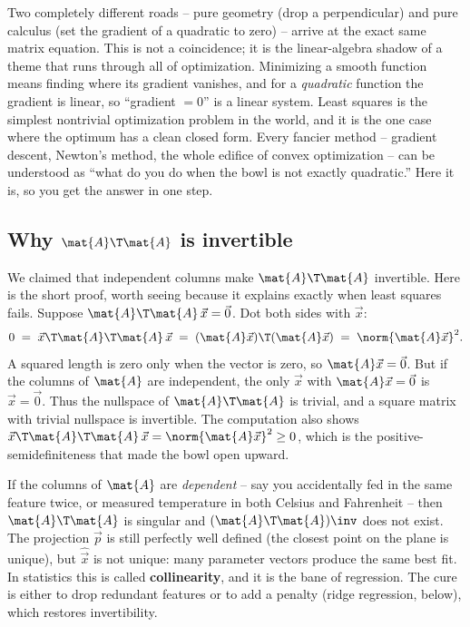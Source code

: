 \begin{connectionbox}
Two completely different roads -- pure geometry (drop a perpendicular) and pure calculus (set the
gradient of a quadratic to zero) -- arrive at the exact same matrix equation. This is not a
coincidence; it is the linear-algebra shadow of a theme that runs through all of optimization.
Minimizing a smooth function means finding where its gradient vanishes, and for a \emph{quadratic}
function the gradient is linear, so ``gradient $=0$'' is a linear system. Least squares is the
simplest nontrivial optimization problem in the world, and it is the one case where the optimum has
a clean closed form. Every fancier method -- gradient descent, Newton's method, the whole edifice
of convex optimization -- can be understood as ``what do you do when the bowl is not exactly
quadratic.'' Here it is, so you get the answer in one step.
\end{connectionbox}

\subsection*{Why \texorpdfstring{$\mat{A}\T\mat{A}$}{A transpose A} is invertible}

We claimed that independent columns make $\mat{A}\T\mat{A}$ invertible. Here is the short proof,
worth seeing because it explains exactly when least squares fails. Suppose
$\mat{A}\T\mat{A}\,\vec{x}=\vec{0}$. Dot both sides with $\vec{x}$:
\[
  0 \;=\; \vec{x}\T\mat{A}\T\mat{A}\,\vec{x} \;=\; (\mat{A}\vec{x})\T(\mat{A}\vec{x})
  \;=\; \norm{\mat{A}\vec{x}}^2.
\]
A squared length is zero only when the vector is zero, so $\mat{A}\vec{x}=\vec{0}$. But if the
columns of $\mat{A}$ are independent, the only $\vec{x}$ with $\mat{A}\vec{x}=\vec{0}$ is
$\vec{x}=\vec{0}$. Thus the nullspace of $\mat{A}\T\mat{A}$ is trivial, and a square matrix with
trivial nullspace is invertible. The computation also shows $\vec{x}\T\mat{A}\T\mat{A}\,\vec{x}
=\norm{\mat{A}\vec{x}}^2\ge 0$, which is the positive-semidefiniteness that made the bowl open
upward.

\begin{trapbox}
If the columns of $\mat{A}$ are \emph{dependent} -- say you accidentally fed in the same feature
twice, or measured temperature in both Celsius and Fahrenheit -- then $\mat{A}\T\mat{A}$ is
singular and $(\mat{A}\T\mat{A})\inv$ does not exist. The projection $\vec{p}$ is still perfectly
well defined (the closest point on the plane is unique), but $\hat{\vec{x}}$ is not unique: many
parameter vectors produce the same best fit. In statistics this is called \textbf{collinearity},
and it is the bane of regression. The cure is either to drop redundant features or to add a penalty
(ridge regression, below), which restores invertibility.
\end{trapbox}

